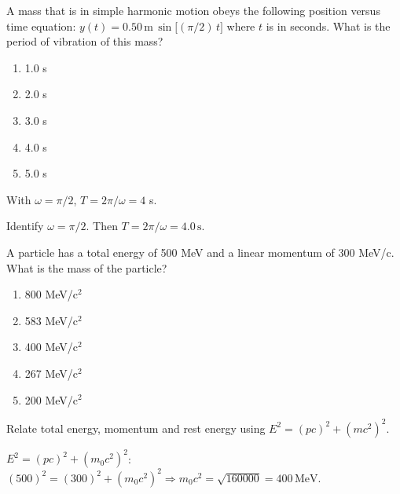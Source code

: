 \item \label{prob:31}
A mass that is in simple harmonic motion obeys the following position versus time equation: $y(t)=0.50\,\mathrm{m}\,\sin\big[(\pi/2)\,t\big]$ where $t$ is in seconds. What is the period of vibration of this mass?
\begin{enumerate}[label=(\Alph*)]
    \item 1.0 s
    \item 2.0 s
    \item 3.0 s
    \item 4.0 s
    \item 5.0 s
\end{enumerate}

\begin{answerbox}
\end{answerbox}
\begin{insightbox}
With $\omega=\pi/2$, $T=2\pi/\omega=4$ s.
\end{insightbox}
\begin{solutionbox}

Identify $\omega=\pi/2$. Then $T=2\pi/\omega=4.0\,\text{s}$.
\end{solutionbox}

\item \label{prob:32}
A particle has a total energy of 500 MeV and a linear momentum of 300 MeV/c. What is the mass of the particle?
\begin{enumerate}[label=(\Alph*)]
    \item 800 MeV/c$^2$
    \item 583 MeV/c$^2$
    \item 400 MeV/c$^2$
    \item 267 MeV/c$^2$
    \item 200 MeV/c$^2$
\end{enumerate}

\begin{answerbox}
\end{answerbox}
\begin{insightbox}
Relate total energy, momentum and rest energy using $E^2=(pc)^2+(mc^2)^2$.
\end{insightbox}
\begin{solutionbox}

$E^2=(pc)^2+(m_0c^2)^2$: $(500)^2=(300)^2+(m_0c^2)^2 \Rightarrow m_0c^2=\sqrt{160000}=400\,\text{MeV}$.
\end{solutionbox}

